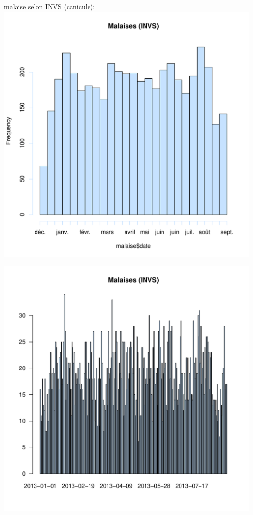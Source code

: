 \documentclass[12pt,english,french,twoside]{report}\usepackage[]{graphicx}\usepackage[]{color}
\makeatletter
\def\maxwidth{ %
  \ifdim\Gin@nat@width>\linewidth
    \linewidth
  \else
    \Gin@nat@width
  \fi
}
\newenvironment{knitrout}{}{} %
\makeatother
\begin{document}
malaise selon INVS (canicule):
\begin{knitrout}
\color{fgcolor}
\includegraphics[width=\maxwidth]{figure/malaises_invs1} 

\includegraphics[width=\maxwidth]{figure/malaises_invs2} 

\end{knitrout}
\end{document}
